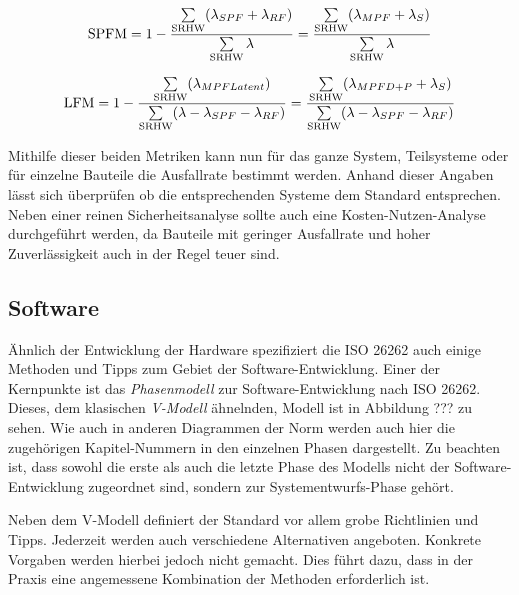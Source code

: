 \documentclass[a4paper,DIV=calc,ngerman]{scrartcl}
\begin{document}
\begin{equation}
\textnormal{SPFM} = 1 - \frac{\sum\limits_{\textnormal{SRHW}} (\lambda_{SPF} + \lambda_{RF})}{\sum\limits_{\textnormal{SRHW}} \lambda} = \frac{\sum\limits_{\textnormal{SRHW}} (\lambda_{MPF} + \lambda_{S})}{\sum\limits_{\textnormal{SRHW}} \lambda}
\label{eq:spfm}
\end{equation}

\begin{equation}
\textnormal{LFM} = 1 - \frac{\sum\limits_{\textnormal{SRHW}} (\lambda_{MPF Latent})}{\sum\limits_{\textnormal{SRHW}} (\lambda - \lambda_{SPF} - \lambda_{RF})} = \frac{\sum\limits_{\textnormal{SRHW}} (\lambda_{MPF D+P} + \lambda_{S})}{\sum\limits_{\textnormal{SRHW}} (\lambda - \lambda_{SPF} - \lambda_{RF})}
\label{eq:lfm}
\end{equation}

Mithilfe dieser beiden Metriken kann nun für das ganze System, Teilsysteme oder für einzelne Bauteile die Ausfallrate bestimmt werden. Anhand dieser Angaben lässt sich überprüfen ob die entsprechenden Systeme dem Standard entsprechen. Neben einer reinen Sicherheitsanalyse sollte auch eine Kosten-Nutzen-Analyse durchgeführt werden, da Bauteile mit geringer Ausfallrate und hoher Zuverlässigkeit auch in der Regel teuer sind.



\subsection{Software}
\label{sec:Software}
Ähnlich der Entwicklung der Hardware spezifiziert die ISO 26262 auch einige Methoden und Tipps zum Gebiet der Software-Entwicklung. Einer der Kernpunkte ist das \emph{Phasenmodell} zur Software-Entwicklung nach ISO 26262. Dieses, dem klasischen \emph{V-Modell} ähnelnden, Modell ist in Abbildung ??? zu sehen. Wie auch in anderen Diagrammen der Norm werden auch hier die zugehörigen Kapitel-Nummern in den einzelnen Phasen dargestellt. Zu beachten ist, dass sowohl die erste als auch die letzte Phase des Modells nicht der Software-Entwicklung zugeordnet sind, sondern zur Systementwurfs-Phase gehört.


Neben dem V-Modell definiert der Standard vor allem grobe Richtlinien und Tipps. Jederzeit werden auch verschiedene Alternativen angeboten. Konkrete Vorgaben werden hierbei jedoch nicht gemacht. Dies führt dazu, dass in der Praxis eine angemessene Kombination der Methoden erforderlich ist. 
\end{document}
